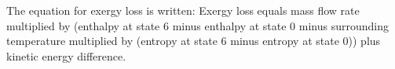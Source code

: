 The equation for exergy loss is written:  
Exergy loss equals mass flow rate multiplied by (enthalpy at state 6 minus enthalpy at state 0 minus surrounding temperature multiplied by (entropy at state 6 minus entropy at state 0)) plus kinetic energy difference.